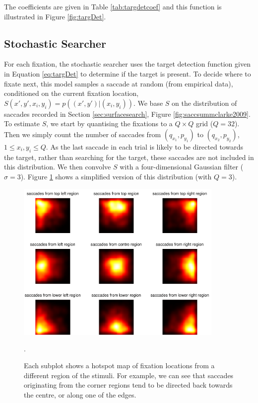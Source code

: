 \documentclass[preprint, authoryear]{elsarticle} %
\begin{document}
The coefficients are given in Table \ref{tab:targdetcoef} and this function is illustrated in Figure \ref{fig:targDet}.

\subsection{Stochastic Searcher}

For each fixation, the stochastic searcher uses the target detection function given in Equation \ref{eq:targDet} to determine if the target is present. To decide where to fixate next, this model samples a saccade at random (from empirical data), conditioned on the current fixation location, $S(x',y',x_i, y_i)=p\left((x',y')|(x_i,y_i)\right)$. We base $S$ on the distribution of saccades recorded in Section \ref{sec:surfacesearch}, Figure \ref{fig:saccsummclarke2009}. To estimate $S$, we start by quantising the fixations to a $Q\times Q$ grid ($Q=32$). Then we simply count the number of saccades from $(q_{x_1}, p_{y_1})$ to $(q_{x_2}, p_{y_2})$, $1\leq x_i, y_i \leq Q$. As the last saccade in each trial is likely to be directed towards the target, rather than searching for the target, these saccades are not included in this distribution. We then convolve $S$ with a four-dimensional Gaussian filter ($\sigma=3$). Figure \ref{fig:saccDistExample} shows a simplified version of this distribution (with $Q=3$). 

\begin{figure}
	\centering
	\includegraphics[width=10cm]{fig/saccDistExample.pdf}
	\caption{Each subplot shows a hotspot map of fixation locations from a different region of the stimuli. For example, we can see that saccades originating from the corner regions tend to be directed back towards the centre, or along one of the edges.}. 
	\label{fig:saccDistExample}
\end{figure}
\end{document}
